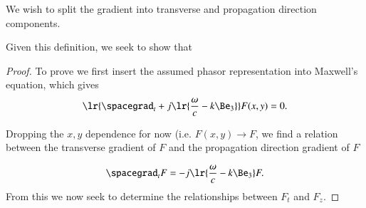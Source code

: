We wish to split the gradient into transverse and propagation direction components.

Given this definition, we seek to show that

\begin{proof}
To prove we first insert the assumed phasor representation into Maxwell's equation, which gives
\begin{equation}\label{eqn:transverseField:summaryMax2}
\lr{\spacegrad_t + j \lr{ \frac{\omega}{c} - k \Be_3 } } F(x,y) = 0.
\end{equation}

Dropping the \( x, y \) dependence for now (i.e.  \( F(x, y) \rightarrow F \), we find a relation between the transverse gradient of \( F \) and the propagation direction gradient of \( F \)

\begin{equation}\label{eqn:transverseField:148}
\spacegrad_t F = - j \lr{ \frac{\omega}{c} - k \Be_3 } F.
\end{equation}
From this we now seek to determine the relationships between \( F_t \) and \( F_z \).


\end{proof}

